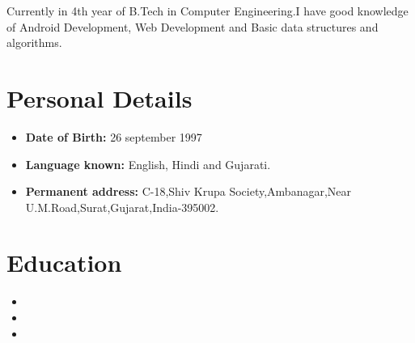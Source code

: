 \documentclass[11pt,a4paper,sans]{moderncv}        %
\begin{document}
\makecvtitle

\small{Currently in 4th year of B.Tech in Computer Engineering.I have good knowledge of Android Development, Web Development and Basic data structures and algorithms. }


\section{Personal Details}
\vspace{6pt}
\begin{itemize}
\item \textbf{Date of Birth: }26 september 1997\vspace{4pt}
\item \textbf{Language known: }English, Hindi and Gujarati\vspace{4pt}.
\item \textbf{Permanent address: }C-18,Shiv Krupa Society,Ambanagar,Near U.M.Road,Surat,Gujarat,India-395002.\vspace{6pt}
\end{itemize}

\section{Education}
\vspace{6pt}
\begin{itemize}
\item{}
\vspace{6pt}
\item{}
\vspace{6pt}
\item{}
\end{itemize}
\end{document}
